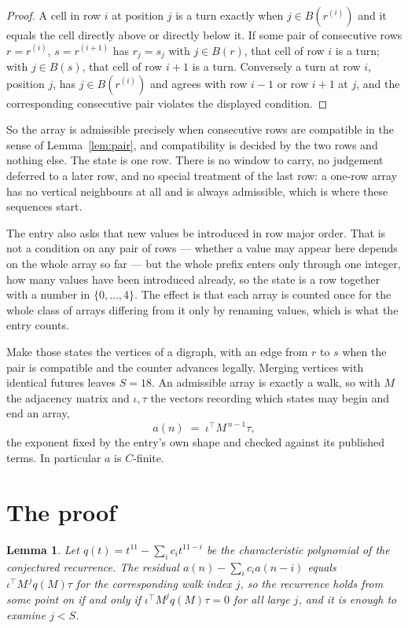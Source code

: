 \documentclass[11pt,a4paper]{article}
\theoremstyle{plain}
\newtheorem{lemma}[theorem]{Lemma}
\theoremstyle{definition}
\begin{document}
\begin{proof}
A cell in row $i$ at position $j$ is a turn exactly when $j\in B(r^{(i)})$ and it equals the cell directly above or directly below it. If some pair of consecutive rows $r=r^{(i)}$, $s=r^{(i+1)}$ has $r_j=s_j$ with $j\in B(r)$, that cell of row $i$ is a turn; with $j\in B(s)$, that cell of row $i+1$ is a turn. Conversely a turn at row $i$, position $j$, has $j\in B(r^{(i)})$ and agrees with row $i-1$ or row $i+1$ at $j$, and the corresponding consecutive pair violates the displayed condition.
\end{proof}

So the array is admissible precisely when consecutive rows are compatible in the sense of Lemma~\ref{lem:pair}, and compatibility is decided by the two rows and nothing else. The state is one row. There is no window to carry, no judgement deferred to a later row, and no special treatment of the last row: a one-row array has no vertical neighbours at all and is always admissible, which is where these sequences start.

The entry also asks that new values be introduced in row major order. That is not a condition on any pair of rows --- whether a value may appear here depends on the whole array so far --- but the whole prefix enters only through one integer, how many values have been introduced already, so the state is a row together with a number in $\{0,\dots,4\}$. The effect is that each array is counted once for the whole class of arrays differing from it only by renaming values, which is what the entry counts.

Make those states the vertices of a digraph, with an edge from $r$ to $s$ when the pair is compatible and the counter advances legally. Merging vertices with identical futures leaves $S=18$. An admissible array is exactly a walk, so with $M$ the adjacency matrix and $\iota,\tau$ the vectors recording which states may begin and end an array,
\[
a(n)\;=\;\iota^{\!\top}M^{\,n-1}\tau ,
\]
the exponent fixed by the entry's own shape and checked against its published terms. In
particular $a$ is $C$-finite.

\section{The proof}

\begin{lemma}\label{lem:crit}
Let $q(t)=t^{11}-\sum_i c_it^{11-i}$ be the characteristic polynomial of the
conjectured recurrence. The residual $a(n)-\sum_ic_ia(n-i)$ equals
$\iota^{\!\top}M^{\,j}q(M)\tau$ for the corresponding walk index $j$, so the recurrence
holds from some point on if and only if $\iota^{\!\top}M^{j}q(M)\tau=0$ for all large $j$,
and it is enough to examine $j<S$.
\end{lemma}
\end{document}
